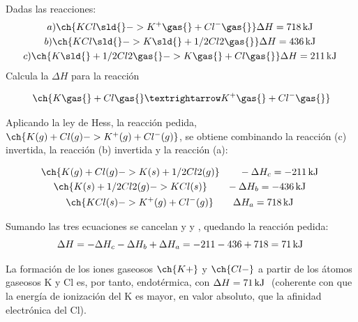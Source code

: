 \begin{exercise}
    Dadas las reacciones:
    \begin{gather*}
        a) \ch{KCl \sld{} -> K^+ \gas{} + Cl^- \gas{}} \Delta H = \energia[kj]{718}\\
        b) \ch{KCl \sld{} -> K \sld{} + 1/2 Cl2 \gas{}} \Delta H = \energia[kj]{436} \\
        c) \ch{K \sld{} + 1/2 Cl2 \gas{} -> K \gas{} + Cl \gas{}} \Delta H = \energia[kj]{211}
    \end{gather*}
    Calcula la \(\Delta H\) para la reacción

    \begin{equation*}
        \ch{K \gas{} + Cl \gas{} → K^+ \gas{} + Cl^- \gas{}}
    \end{equation*}


    \begin{solu}


        Aplicando la ley de Hess, la reacción pedida, \(\ch{K (g) + Cl (g) -> K^+ (g) + Cl^- (g)}\), se obtiene combinando la reacción (c) invertida, la reacción (b) invertida y la reacción (a):

        \begin{gather*}
            \ch{K (g) + Cl (g) -> K (s) + 1/2 Cl2 (g)} \qquad -\Delta H_c = \energia[kj]{-211} \\
            \ch{K (s) + 1/2 Cl2 (g) -> KCl (s)} \qquad -\Delta H_b = \energia[kj]{-436} \\
            \ch{KCl (s) -> K^+ (g) + Cl^- (g)} \qquad \Delta H_a = \energia[kj]{718}
        \end{gather*}

        Sumando las tres ecuaciones se cancelan  y  y , quedando la reacción pedida:
        \[
            \Delta H = -\Delta H_c - \Delta H_b + \Delta H_a = -211-436+718 = \energia[kj]{71}
        \]

        La formación de los iones gaseosos \(\ch{K+}\) y \(\ch{Cl-}\) a partir de los átomos gaseosos K y Cl es, por tanto, endotérmica, con \(\Delta H = \energia[kj]{71}\) (coherente con que la energía de ionización del K es mayor, en valor absoluto, que la afinidad electrónica del Cl).
    \end{solu}
\end{exercise}
